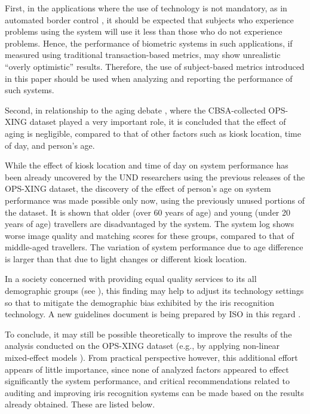 \documentclass{cta-author}%
\begin{document}
First, in the applications where the use of technology is not mandatory,  as in automated border control \cite{GorodnichyARTinABC}, it should  be expected that subjects who experience problems using the system will use it less  than those who do not experience  problems. 
Hence, the performance of biometric systems in such applications, if  measured using traditional transaction-based metrics, may show unrealistic ``overly optimistic'' results. Therefore, the use of subject-based metrics introduced in this paper should be used when analyzing and reporting the performance of such systems. 


Second, in relationship to the aging debate \cite{IET0}, where the CBSA-collected OPS-XING dataset played a very important role, 
it is concluded that the effect of aging is negligible, compared to that of other factors such as kiosk location, time of day, and person's age.



While the effect of kiosk location and time of day on system performance has been  already uncovered by the UND researchers \cite{Bowyer-BTAS2016} using the previous releases of the OPS-XING dataset, the discovery of the effect of person's age on system performance was made possible only now, using the previously unused portions of the dataset.
It is shown that older (over 60 years  of age) and young (under 20 years of age) travellers are disadvantaged by the system. 
The system log shows  worse image quality and  matching scores for these groups, compared to that of middle-aged travellers. 
The variation of system performance due to age difference is larger than that due to light changes or different kiosk location.

In a society concerned with providing equal quality services to its all demographic groups (see \cite{GBA}), this finding may help to adjust its technology settings so that to mitigate  the demographic bias exhibited by the iris recognition technology. A new guidelines  document is being prepared by ISO in this regard \cite{ISO-bias}. 


To conclude, 
it may still be possible theoretically to improve  the results of the analysis conducted on the OPS-XING dataset (e.g., by applying non-linear mixed-effect models \cite{R-book}).
From practical perspective however, 
this additional effort appears of little importance, 
since none of analyzed factors appeared to effect significantly the system performance,
and
critical recommendations related to auditing and 
improving  iris recognition systems 
can  be made 
based on the results already obtained. 
These are listed below.
\end{document}
